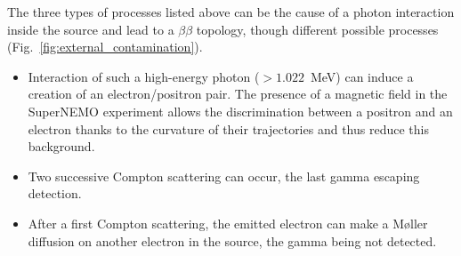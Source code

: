 The three types of processes listed above can be the cause of a photon interaction inside the source and lead to a $\beta\beta$ topology, though different possible processes (Fig.~\ref{fig:external_contamination}).
\begin{itemize}
\item Interaction of such a high-energy photon ($>1.022$~MeV) can induce a creation of an electron/positron pair.
  The presence of a magnetic field in the SuperNEMO experiment allows the discrimination between a positron and an electron thanks to the curvature of their trajectories and thus reduce this background.
\item Two successive Compton scattering can occur, the last gamma escaping detection.
\item After a first Compton scattering, the emitted electron can make a M\o{}ller diffusion on another electron in the source, the gamma being not detected.
\end{itemize}
